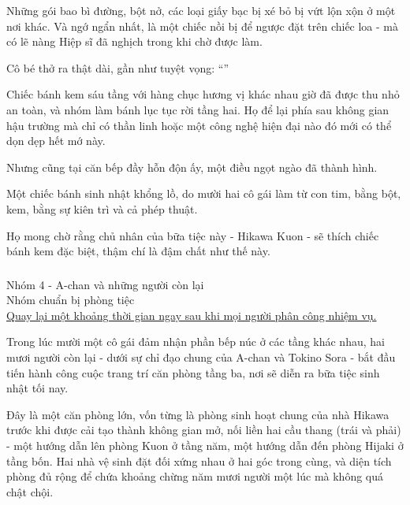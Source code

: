 \documentclass[../main.tex]{subfiles}
\begin{document}
Những gói bao bì đường, bột nở, các loại giấy bạc bị xé bỏ bị vứt lộn xộn ở một nơi khác. Và ngớ ngẩn nhất, là một chiếc nồi bị để ngược đặt trên chiếc loa - mà có lẽ nàng Hiệp sĩ đã nghịch trong khi chờ được làm.

Cô bé thở ra thật dài, gần như tuyệt vọng: ``''

Chiếc bánh kem sáu tầng với hàng chục hương vị khác nhau giờ đã được thu nhỏ an toàn, và nhóm làm bánh lục tục rời tầng hai. Họ để lại phía sau không gian hậu trường mà chỉ có thần linh hoặc một công nghệ hiện đại nào đó mới có thể dọn dẹp hết mớ này.

Nhưng cũng tại căn bếp đầy hỗn độn ấy, một điều ngọt ngào đã thành hình.

Một chiếc bánh sinh nhật khổng lồ, do mười hai cô gái làm từ con tim, bằng bột, kem, bằng sự kiên trì và cả phép thuật.

Họ mong chờ rằng chủ nhân của bữa tiệc này - Hikawa Kuon - sẽ thích chiếc bánh kem đặc biệt, thậm chí là đậm chất \textit{\hll} như thế này.

\subsubsection*{\label{P4.1c}}

\begin{center}
    {\color{T2} Nhóm 4 - A-chan và những người còn lại\\Nhóm chuẩn bị phòng tiệc}\\
    \uline{Quay lại một khoảng thời gian ngay sau khi mọi người phân công nhiệm vụ.}
\end{center}

Trong lúc mười một cô gái đảm nhận phần bếp núc ở các tầng khác nhau, hai mươi người còn lại - dưới sự chỉ đạo chung của A-chan và Tokino Sora - bắt đầu tiến hành công cuộc trang trí căn phòng tầng ba, nơi sẽ diễn ra bữa tiệc sinh nhật tối nay.

Đây là một căn phòng lớn, vốn từng là phòng sinh hoạt chung của nhà Hikawa trước khi được cải tạo thành không gian mở, nối liền hai cầu thang (trái và phải) - một hướng dẫn lên phòng Kuon ở tầng năm, một hướng dẫn đến phòng Hijaki ở tầng bốn. Hai nhà vệ sinh đặt đối xứng nhau ở hai góc trong cùng, và diện tích phòng đủ rộng để chứa khoảng chừng năm mươi người một lúc mà không quá chật chội.
\end{document}
